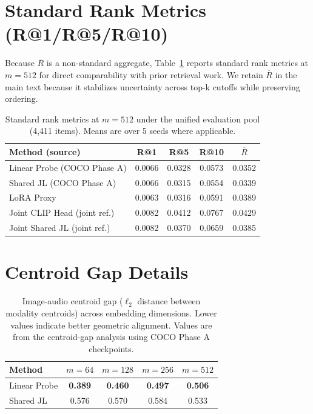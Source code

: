 \documentclass{article}
\newcommand{\avgR}{\overline{R}}
\begin{document}
\section{Standard Rank Metrics \texorpdfstring{(R@1/R@5/R@10)}{(R@k)}}
\label{app:rk}

Because $\avgR$ is a non-standard aggregate, Table~\ref{tab:rk512} reports standard rank metrics at $m=512$ for direct comparability with prior retrieval work.
We retain $\avgR$ in the main text because it stabilizes uncertainty across top-k cutoffs while preserving ordering.

\begin{table}[ht]
  \caption{Standard rank metrics at $m=512$ under the unified evaluation pool (4,411 items).
  Means are over 5 seeds where applicable.}
  \label{tab:rk512}
  \centering
  \footnotesize
  \begin{tabular}{lcccc}
    \toprule
    Method (source) & R@1 & R@5 & R@10 & $\avgR$ \\
    \midrule
    Linear Probe (COCO Phase A) & 0.0066 & 0.0328 & 0.0573 & 0.0352 \\
    Shared JL (COCO Phase A)   & 0.0066 & 0.0315 & 0.0554 & 0.0339 \\
    LoRA Proxy                 & 0.0063 & 0.0316 & 0.0591 & 0.0389 \\
    Joint CLIP Head (joint ref.) & 0.0082 & 0.0412 & 0.0767 & 0.0429 \\
    Joint Shared JL (joint ref.) & 0.0082 & 0.0370 & 0.0659 & 0.0385 \\
    \bottomrule
  \end{tabular}
\end{table}

\section{Centroid Gap Details}
\label{app:gap}

\begin{table}[ht]
  \caption{Image-audio centroid gap ($\ell_2$ distance between modality centroids) across embedding dimensions.
  Lower values indicate better geometric alignment.
  Values are from the centroid-gap analysis using COCO Phase A checkpoints.}
  \label{tab:gap}
  \centering
  \footnotesize
  \begin{tabular}{lcccc}
    \toprule
    Method & $m=64$ & $m=128$ & $m=256$ & $m=512$ \\
    \midrule
    Linear Probe & \bf{0.389} & \bf{0.460} & \bf{0.497} & \bf{0.506} \\
    Shared JL    & 0.576 & 0.570 & 0.584 & 0.533 \\
    \bottomrule
  \end{tabular}
\end{table}
\end{document}
